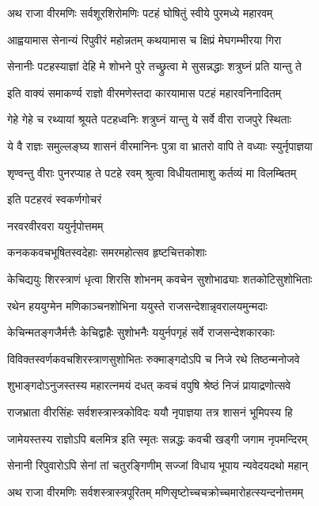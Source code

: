 
\twolineshloka
{अथ राजा वीरमणिः सर्वशूरशिरोमणिः}
{पटहं घोषितुं स्वीये पुरमध्ये महारवम्}%

\twolineshloka
{आह्वयामास सेनान्यं रिपुवीरं महोन्नतम्}
{कथयामास च क्षिप्रं मेघगम्भीरया गिरा}%


\twolineshloka
{सेनानीः पटहस्याज्ञां देहि मे शोभने पुरे}
{तच्छ्रुत्वा मे सुसन्नद्धाः शत्रुघ्नं प्रति यान्तु ते}%

\twolineshloka
{इति वाक्यं समाकर्ण्य राज्ञो वीरमणेस्तदा}
{कारयामास पटहं महारवनिनादितम्}%

\twolineshloka
{गेहे गेहे च रथ्यायां श्रूयते पटहध्वनिः}
{शत्रुघ्नं यान्तु ये सर्वे वीरा राजपुरे स्थिताः}%

\twolineshloka
{ये वै राज्ञः समुल्लङ्घ्य शासनं वीरमानिनः}
{पुत्रा वा भ्रातरो वापि ते वध्याः स्युर्नृपाज्ञया}%

\twolineshloka
{शृण्वन्तु वीराः पुनरप्याह ते पटहे रवम्}
{श्रुत्वा विधीयतामाशु कर्तव्यं मा विलम्बितम्}%


इति पटहरवं स्वकर्णगोचरं

नरवरवीरवरा ययुर्नृपोत्तमम्

\twolineshloka
{कनककवचभूषितस्वदेहाः}
{समरमहोत्सव हृष्टचित्तकोशाः}%

\twolineshloka
{केचिद्ययुः शिरस्त्राणं धृत्वा शिरसि शोभनम्}
{कवचेन सुशोभाढ्याः शतकोटिसुशोभिताः}%

\twolineshloka
{रथेन हययुग्मेन मणिकाञ्चनशोभिना}
{ययुस्ते राजसन्देशान्नृवरालयमुन्मदाः}%

\twolineshloka
{केचिन्मतङ्गजैर्मत्तैः केचिद्वाहैः सुशोभनैः}
{ययुर्नपगृहं सर्वे राजसन्देशकारकाः}%

\twolineshloka
{विविक्तस्वर्णकवचशिरस्त्राणसुशोभितः}
{रुक्माङ्गदोऽपि च निजे रथे तिष्ठन्मनोजवे}%

\twolineshloka
{शुभाङ्गदोऽनुजस्तस्य महारत्नमयं दधत्}
{कवचं वपुषि श्रेष्ठं निजं प्रायाद्रणोत्सवे}%

\twolineshloka
{राजभ्राता वीरसिंहः सर्वशस्त्रास्त्रकोविदः}
{ययौ नृपाज्ञया तत्र शासनं भूमिपस्य हि}%

\twolineshloka
{जामेयस्तस्य राज्ञोऽपि बलमित्र इति स्मृतः}
{सन्नद्धः कवची खड्गी जगाम नृपमन्दिरम्}%

\twolineshloka
{सेनानी रिपुवारोऽपि सेनां तां चतुरङ्गिणीम्}
{सज्जां विधाय भूपाय न्यवेदयदथो महान्}%

\twolineshloka
{अथ राजा वीरमणिः सर्वशस्त्रास्त्रपूरितम्}
{मणिसृष्टोच्चचक्रोच्चमारोहत्स्यन्दनोत्तमम्}%

